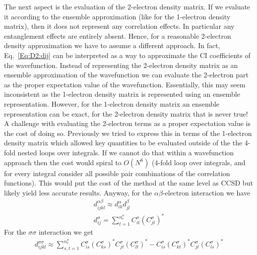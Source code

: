 \documentclass[pra,nofootinbib]{revtex4-1}
\begin{document}
The next aspect is the evaluation of the 2-electron density matrix. If we evaluate it
according to the ensemble approximation (like for the 1-electron density matrix), then it
does not represent any correlation effects. In particular any entanglement effects are
entirely absent. Hence, for a reasonable 2-electron density approximation we have to 
assume a different approach. In fact, Eq.~\ref{Eq:D2:dij} can be interpreted as
a way to approximate the CI coefficients of the wavefunction. Instead of representing
the 2-electron density matrix as an ensemble approximation of the wavefunction we
can evaluate the 2-electron part as the proper expectation value of the wavefunction. 
Essentially, this may seem inconsistent as the 1-electron density matrix is represented
using an ensemble representation. However, for the 1-electron density matrix an ensemble
representation can be exact, for the 2-electron density matrix that is never true!
A challenge with evaluating the 2-electron terms as a proper expectation value
is the cost of doing so. Previously we tried to express this in terms of the 
1-electron density matrix which allowed key quantities to be evaluated outside of the
the 4-fold nested loops over integrals. If we cannot do that within a wavefunction approach
then the cost would spiral to $O(N^6)$ (4-fold loop over integrals, and for every integral
consider all possible pair combinations of the correlation functions). This would put
the cost of the method at the same level as CCSD but likely yield less accurate results.
Anyway, for the $\alpha\beta$-electron interaction we have
\begin{eqnarray}
   d_{ijkl}^{\alpha\beta} \approx d_{ik}^\alpha d_{jl}^\beta \\
   d_{ij}^\sigma = \sum_{t=1}^{n_e^\sigma} C_{it}^\sigma \left(C_{jt}^\sigma\right)^*
\end{eqnarray}
For the $\sigma\sigma$ interaction we get
\begin{eqnarray}
   d_{ijkl}^{\sigma\sigma} \approx
   \sum_{s,t=1}^{n_e^\sigma} C_{is}^\sigma \left(C_{ks}^\sigma\right)^* 
                             C_{jt}^\sigma \left(C_{lt}^\sigma\right)^*
                           - C_{is}^\sigma \left(C_{kt}^\sigma\right)^* 
                             C_{jt}^\sigma \left(C_{ls}^\sigma\right)^*
\end{eqnarray}





\end{document}
